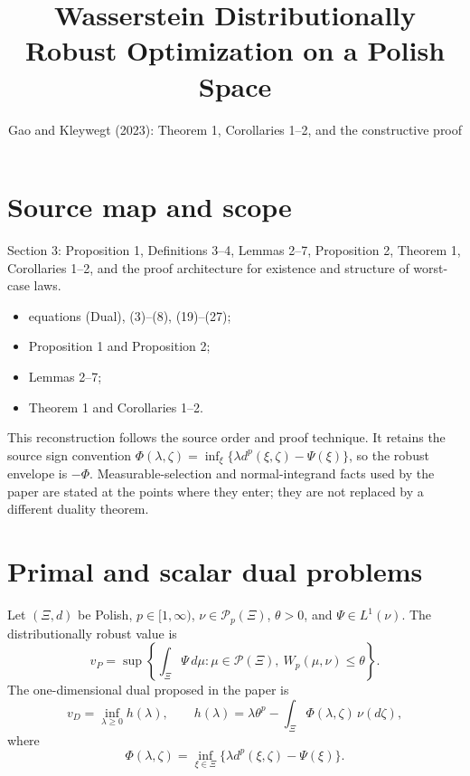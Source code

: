 
\title{Wasserstein Distributionally Robust Optimization on a Polish Space}
\author{}
\date{Gao and Kleywegt (2023): Theorem 1, Corollaries 1--2, and the constructive proof}

\maketitle

\section*{Source map and scope}
\begin{description}[style=nextline,leftmargin=3.2cm,labelwidth=3cm]
\item[Primary source] \texttt{}
\item[Coverage] Section 3: Proposition 1, Definitions 3--4, Lemmas 2--7, Proposition 2, Theorem 1, Corollaries 1--2, and the proof architecture for existence and structure of worst-case laws.
\item[Source anchors]
\begin{itemize}[leftmargin=2em]
  \item equations (Dual), (3)--(8), (19)--(27);
  \item Proposition 1 and Proposition 2;
  \item Lemmas 2--7;
  \item Theorem 1 and Corollaries 1--2.
\end{itemize}
\end{description}

This reconstruction follows the source order and proof technique.  It retains the source sign convention
\(\Phi(\lambda,\zeta)=\inf_\xi\{\lambda d^p(\xi,\zeta)-\Psi(\xi)\}\), so the robust envelope is
\(-\Phi\).  Measurable-selection and normal-integrand facts used by the paper are stated at the points
where they enter; they are not replaced by a different duality theorem.

\section{Primal and scalar dual problems}
Let \((\Xi,d)\) be Polish, \(p\in[1,\infty)\), \(\nu\in\mathcal P_p(\Xi)\), \(\theta>0\), and
\(\Psi\in L^1(\nu)\).  The distributionally robust value is
\[
 v_P=\sup\left\{\int_\Xi\Psi\,d\mu: \mu\in\mathcal P(\Xi),\ W_p(\mu,\nu)\le\theta\right\}.
\]
The one-dimensional dual proposed in the paper is
\begin{equation}\label{eq:gk-dual}
 v_D=\inf_{\lambda\ge0}h(\lambda),\qquad
 h(\lambda)=\lambda\theta^p-\int_\Xi\Phi(\lambda,\zeta)\,\nu(d\zeta),
\end{equation}
where
\begin{equation}\label{eq:gk-Phi}
 \Phi(\lambda,\zeta)=\inf_{\xi\in\Xi}
 \{\lambda d^p(\xi,\zeta)-\Psi(\xi)\}.
\end{equation}

